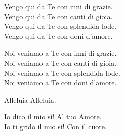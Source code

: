 
\strofa Vengo qui da Te con inni di grazie.\\
Vengo qui da Te con canti di gioia.\\
Vengo qui da Te con splendida lode.\\
Vengo qui da Te con doni d'amore.

\spazio


\spazio

\strofa Noi veniamo a Te con inni di grazie.\\
Noi veniamo a Te con canti di gioia.\\
Noi veniamo a Te con splendida lode.\\
Noi veniamo a Te con doni d'amore.

\spazio


\spazio

Alleluia Alleluia. 

\spazio

\strofa Io dico il mio sì! Al tuo Amore.\\
Io ti grido il mio sì! Con il cuore. 

\spazio

 

\spazio